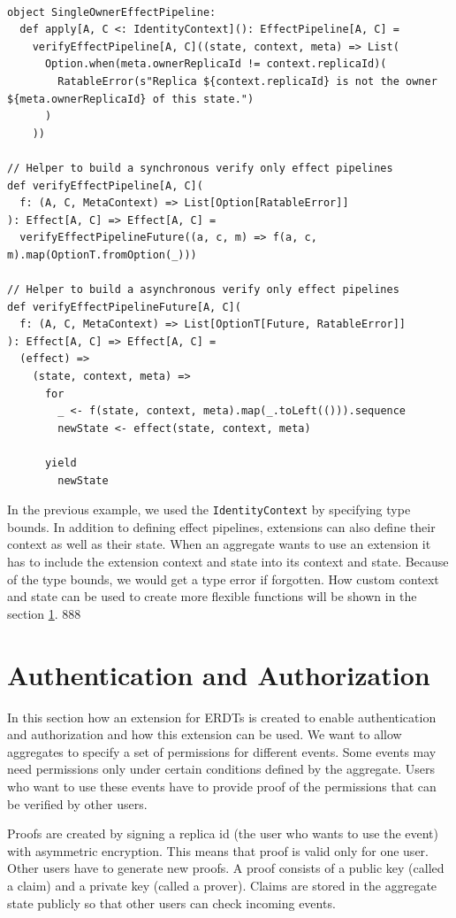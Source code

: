 \documentclass[
	english,
	ruledheaders=section,   %
	class=report,		    %
	thesis={type=bachelor}, %
	accentcolor=9c,			%
	custommargins=true,    %
	marginpar=false,        %
	parskip=half-,          %
	fontsize=11pt,          %
]{tudapub}
\begin{document}
\begin{lstlisting}
  
object SingleOwnerEffectPipeline:
  def apply[A, C <: IdentityContext](): EffectPipeline[A, C] =
    verifyEffectPipeline[A, C]((state, context, meta) => List(
      Option.when(meta.ownerReplicaId != context.replicaId)(
        RatableError(s"Replica ${context.replicaId} is not the owner ${meta.ownerReplicaId} of this state.")
      )
    ))

// Helper to build a synchronous verify only effect pipelines
def verifyEffectPipeline[A, C](
  f: (A, C, MetaContext) => List[Option[RatableError]]
): Effect[A, C] => Effect[A, C] =
  verifyEffectPipelineFuture((a, c, m) => f(a, c, m).map(OptionT.fromOption(_)))
  
// Helper to build a asynchronous verify only effect pipelines
def verifyEffectPipelineFuture[A, C](
  f: (A, C, MetaContext) => List[OptionT[Future, RatableError]]
): Effect[A, C] => Effect[A, C] =
  (effect) =>
    (state, context, meta) => 
      for
        _ <- f(state, context, meta).map(_.toLeft(())).sequence
        newState <- effect(state, context, meta)

      yield
        newState

\end{lstlisting}

In the previous example, we used the \texttt{IdentityContext} by specifying type bounds. In addition to defining effect pipelines, extensions can also define their context as well as their state. When an aggregate wants to use an extension it has to include the extension context and state into its context and state. Because of the type bounds, we would get a type error if forgotten. How custom context and state can be used to create more flexible functions will be shown in the section \ref{sec:auth}.
888
\section{Authentication and Authorization} \label{sec:auth}
In this section how an extension for ERDTs is created to enable authentication and authorization and how this extension can be used. We want to allow aggregates to specify a set of permissions for different events. Some events may need permissions only under certain conditions defined by the aggregate. Users who want to use these events have to provide proof of the permissions that can be verified by other users.

Proofs are created by signing a replica id (the user who wants to use the event) with asymmetric encryption. This means that proof is valid only for one user. Other users have to generate new proofs. A proof consists of a public key (called a claim) and a private key (called a prover). Claims are stored in the aggregate state publicly so that other users can check incoming events.
\end{document}
